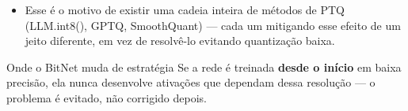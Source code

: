 \begin{frame}
{\begin{itemize}
			\item Esse é o motivo de existir uma cadeia inteira de métodos de PTQ (LLM.int8(), GPTQ, SmoothQuant) --- cada um mitigando esse efeito de um jeito diferente, em vez de resolvê-lo evitando quantização baixa.
		\end{itemize}
		\begin{alertblock}{Onde o BitNet muda de estratégia}
			Se a rede é treinada \textbf{desde o início} em baixa precisão, ela nunca desenvolve ativações que dependam dessa resolução --- o problema é evitado, não corrigido depois.
		\end{alertblock}
	}
\end{frame}
